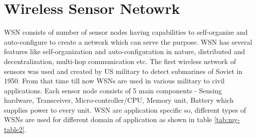 \section{Wireless Sensor Netowrk}
WSN consists of number of sensor nodes having capabilities to self-organize and auto-configure to create a network which can serve the purpose. WSN has several features like self-organization and auto-configuration in nature, distributed and decentralization, multi-hop communication etc. The first wireless network of sensors was used and created by US military to detect submarines of Soviet in 1950. From that time till now WSNs are used in various military to civil applications. Each sensor node consists of 5 main components - Sensing hardware, Transceiver, Micro-controller/CPU, Memory unit, Battery which supplies power to every unit. WSN are application specific so, different types of WSNs are used for different domain of application \cite{articleTypesWSN} as shown in table \ref{tab:my-table2}.
\begin{table}[htp]
\centering
\caption{Types of WSN.}
\label{tab:my-table2}
\end{table}

